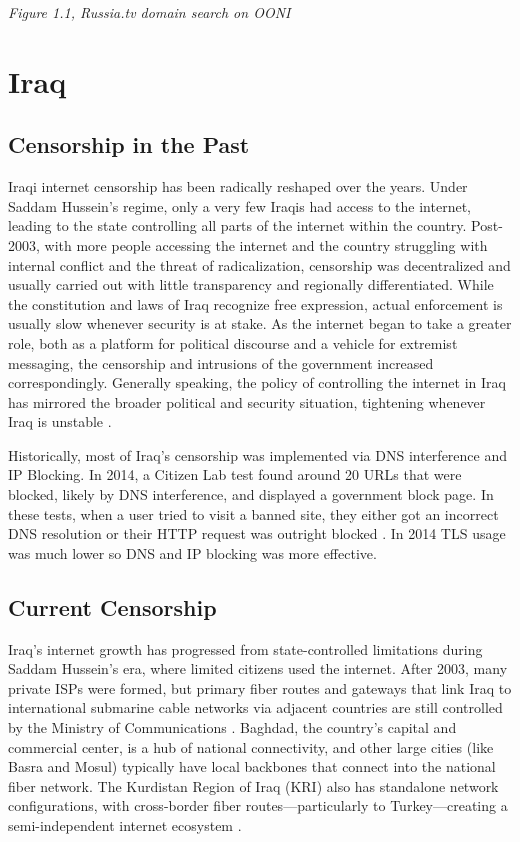 \centerline{\textit{Figure 1.1, Russia.tv domain search on OONI}}

\section{Iraq}

\subsection{Censorship in the Past}

Iraqi internet censorship has been radically reshaped over the years. Under Saddam Hussein's regime, only a very few Iraqis had access to the internet, leading to the state controlling all parts of the internet within the country. Post-2003, with more people accessing the internet and the country struggling with internal conflict and the threat of radicalization, censorship was decentralized and usually carried out with little transparency and regionally differentiated. While the constitution and laws of Iraq recognize free expression, actual enforcement is usually slow whenever security is at stake. As the internet began to take a greater role, both as a platform for political discourse and a vehicle for extremist messaging, the censorship and intrusions of the government increased correspondingly. Generally speaking, the policy of controlling the internet in Iraq has mirrored the broader political and security situation, tightening whenever Iraq is unstable \cite{freedomhouseIraqFreedom}.

Historically, most of Iraq's censorship was implemented via DNS interference and IP Blocking. In 2014, a Citizen Lab test found around 20 URLs that were blocked, likely by DNS interference, and displayed a government block page. In these tests, when a user tried to visit a banned site, they either got an incorrect DNS resolution or their HTTP request was outright blocked \cite{citizenlabIraqPastCensorship}. In 2014 TLS usage was much lower so DNS and IP blocking was more effective. 

\subsection{Current Censorship}

Iraq's internet growth has progressed from state-controlled limitations during Saddam Hussein's era, where limited citizens used the internet. After 2003, many private ISPs were formed, but primary fiber routes and gateways that link Iraq to international submarine cable networks via adjacent countries are still controlled by the Ministry of Communications \cite{IraqCMC}. Baghdad, the country's capital and commercial center, is a hub of national connectivity, and other large cities (like Basra and Mosul) typically have local backbones that connect into the national fiber network. The Kurdistan Region of Iraq (KRI) also has standalone network configurations, with cross-border fiber routes—particularly to Turkey—creating a semi-independent internet ecosystem \cite{freedomhouseIraqFreedom}. 


